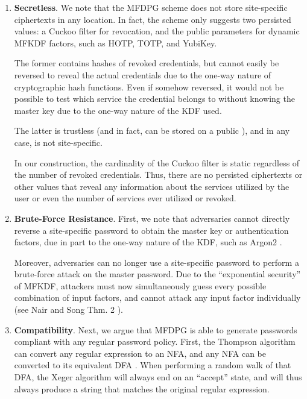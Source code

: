 \begin{enumerate}[leftmargin=*]
    \item \textbf{Secretless}. We note that the MFDPG scheme does not store site-specific ciphertexts in any location. In fact, the scheme only suggests two persisted values: a Cuckoo filter for revocation, and the public parameters for dynamic MFKDF factors, such as HOTP, TOTP, and YubiKey.

    \medskip

    The former contains hashes of revoked credentials, but cannot easily be reversed to reveal the actual credentials due to the one-way nature of cryptographic hash functions. Even if somehow reversed, it would not be possible to test which service the credential belongs to without knowing the master key due to the one-way nature of the KDF used.

    \medskip

    The latter is trustless (and in fact, can be stored on a public \cite{mfkdf_wallet}), and in any case, is not site-specific.

    \medskip
    
    In our construction, the cardinality of the Cuckoo filter is static regardless of the number of revoked credentials. Thus, there are no persisted ciphertexts or other values that reveal any information about the services utilized by the user or even the number of services ever utilized or revoked.

    \item \textbf{Brute-Force Resistance}.
    First, we note that adversaries cannot directly reverse a site-specific password to obtain the master key or authentication factors, due in part to the one-way nature of the KDF, such as Argon2 \cite{argon2}.

    \medskip

    Moreover, adversaries can no longer use a site-specific password to perform a brute-force attack on the master password. Due to the ``exponential security'' of MFKDF, attackers must now simultaneously guess every possible combination of input factors, and cannot attack any input factor individually (see Nair and Song Thm. 2 \cite{mfkdf}).
    
    \item \textbf{Compatibility}. Next, we argue that MFDPG is able to generate passwords compliant with any regular password policy. First, the Thompson algorithm \cite{thompson1968programming} can convert any regular expression to an NFA, and any NFA can be converted to its equivalent DFA \cite{rabin1959finite}.
    When performing a random walk of that DFA, the Xeger \cite{team2009xeger} algorithm will always end on an ``accept'' state, and will thus always produce a string that matches the original regular expression.
    

\end{enumerate}
